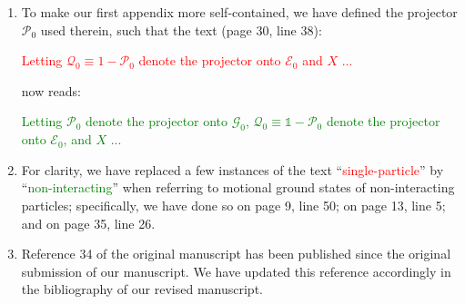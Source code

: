 \documentclass[preprint]{revtex4-1}
\newcommand{\E}{\mathcal{E}}
\newcommand{\G}{\mathcal{G}}
\renewcommand{\P}{\mathcal{P}}
\newcommand{\Q}{\mathcal{Q}}
\newcommand{\1}{\mathds{1}}
\newcommand{\red}[1]{\textcolor{red}{#1}}
\newcommand{\green}[1]{\textcolor{green}{#1}}
\begin{document}
\begin{enumerate}[label=(R3.\arabic*)]
\item To make our first appendix more self-contained, we have defined
  the projector $\P_0$ used therein, such that the text (page 30, line
  38):

  \red{Letting $\Q_0\equiv1-\P_0$ denote the projector onto $\E_0$ and
    $X$ ...}

  now reads:

  \green{Letting $\P_0$ denote the projector onto $\G_0$,
    $\Q_0\equiv\1-\P_0$ denote the projector onto $\E_0$, and $X$ ...}


\item For clarity, we have replaced a few instances of the text
  ``\red{single-particle}'' by ``\green{non-interacting}'' when
  referring to motional ground states of non-interacting particles;
  specifically, we have done so on page 9, line 50; on page 13, line
  5; and on page 35, line 26.

\item Reference 34 of the original manuscript has been published since
  the original submission of our manuscript.  We have updated this
  reference accordingly in the bibliography of our revised manuscript.

\end{enumerate}
\end{document}
